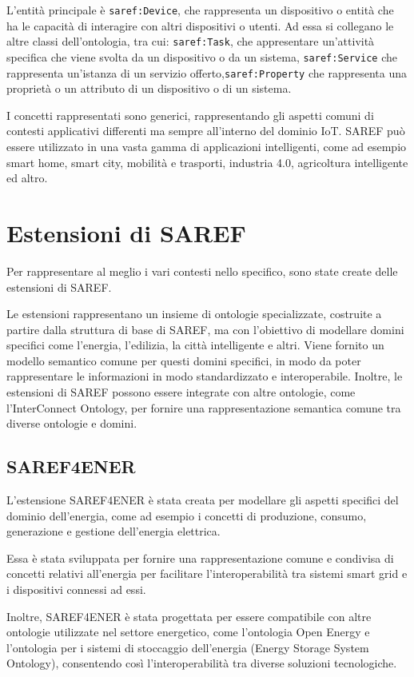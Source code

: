 L'entità principale è \texttt{saref:Device}, che rappresenta un dispositivo o
entità che ha le capacità di interagire con altri dispositivi o utenti. Ad essa
si collegano le altre classi dell'ontologia, tra cui: \texttt{saref:Task}, che
appresentare un'attività specifica che viene svolta da un dispositivo o da un
sistema, \texttt{saref:Service} che rappresenta un'istanza di un servizio
offerto,\texttt{saref:Property} che rappresenta una proprietà o un attributo di
un dispositivo o di un sistema.

I concetti rappresentati sono generici, rappresentando gli aspetti comuni di
contesti applicativi differenti ma sempre all'interno del dominio IoT. SAREF
può essere utilizzato in una vasta gamma di applicazioni intelligenti,
come ad esempio smart home, smart city, mobilità e trasporti, industria 4.0,
agricoltura intelligente ed altro.

\section{Estensioni di SAREF}
Per rappresentare al meglio i vari contesti nello specifico, sono state create
delle estensioni di SAREF.

Le estensioni rappresentano un insieme di ontologie specializzate, costruite a
partire dalla struttura di base di SAREF, ma con l'obiettivo di
modellare domini specifici come l'energia, l'edilizia, la città intelligente e
altri. Viene fornito un modello semantico comune per questi domini specifici,
in modo da poter rappresentare le informazioni in modo standardizzato e
interoperabile.
Inoltre, le estensioni di SAREF possono essere integrate con altre ontologie,
come l'InterConnect Ontology, per fornire una rappresentazione semantica comune
tra diverse ontologie e domini.

\subsection{SAREF4ENER}
L'estensione SAREF4ENER \cite{saref4ener} è stata creata per modellare gli
aspetti specifici del
dominio dell'energia, come ad esempio i concetti di produzione, consumo,
generazione e gestione dell'energia elettrica.

Essa è stata sviluppata per fornire una rappresentazione comune e condivisa di
concetti relativi all'energia per facilitare l'interoperabilità tra sistemi
smart grid e i dispositivi connessi ad essi.

Inoltre, SAREF4ENER è stata progettata per essere compatibile con altre
ontologie utilizzate nel settore energetico, come l'ontologia Open Energy e
l'ontologia per i sistemi di stoccaggio dell'energia (Energy Storage System
Ontology), consentendo così l'interoperabilità tra diverse soluzioni
tecnologiche.

